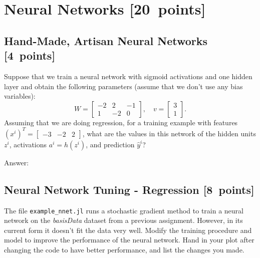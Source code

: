 \documentclass{article}
\newcommand{\ask}[1]{\textcolor{question}{#1}}
\newenvironment{answer}{\par\begingroup\color{answer}Answer: }{\endgroup}
\newcommand{\pts}[1]{\textcolor{points}{[#1~points]}}
\newcommand{\TODO}{\color{red}{TODO}}
\begin{document}
\clearpage
\section{Neural Networks \pts{20}}


\subsection{Hand-Made, Artisan Neural Networks \pts{4}}

Suppose that we train a neural network with sigmoid activations and one hidden layer and obtain the following parameters (assume that we don't use any bias variables):
\[
    W = \begin{bmatrix} -2 & 2 & -1\\1 & -2 & 0 \end{bmatrix}
    ,\quad
    v = \begin{bmatrix} 3 \\ 1 \end{bmatrix}
.\]
Assuming that we are doing regression,
\ask{for a training example with features $(x^i)^T = \begin{bmatrix} -3 &-2 & 2 \end{bmatrix}$,
what are the values in this network of the hidden units $z^i$,
activations $a^i = h(z^i)$,
and prediction $\hat{y}^i$?}

\begin{answer}\TODO\end{answer}

\subsection{Neural Network Tuning - Regression \pts{8}}

The file \texttt{example\_nnet.jl} runs a stochastic gradient method to train a neural network on the \emph{basisData} dataset from a previous assignment. However, in its current form it doesn't fit the data very well. Modify the training procedure and model to improve the performance of the neural network. \ask{Hand in your plot after changing the code to have better performance, and list the changes you made}.
\end{document}
